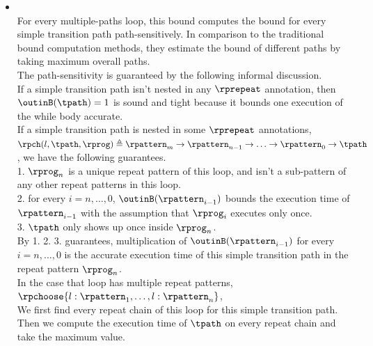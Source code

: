 \begin{itemize}
  \item
  \\
  For every multiple-paths loop,
  this bound computes the bound for every simple transition path path-sensitively.
  In comparison to the traditional bound computation methods, they
  estimate the bound of different paths by taking maximum overall paths.
  \\
  The path-sensitivity is guaranteed by the following informal discussion.
  \\
  If a simple transition path isn't nested in any $\rprepeat$ annotation, then
  $\outinB(\tpath) = 1$ is sound and tight because it bounds one execution of the while body accurate.
  \\
  If a simple transition path is nested in some $\rprepeat$ annotations,
  $\rpch(l, \tpath, \rprog) \triangleq \rpattern_m \to \rpattern_{n-1} \to \ldots \to \rpattern_{0} \to \tpath$, we have the following guarantees.
  \\
  1. $\rprog_n$ is a unique repeat pattern of this loop,
  and isn't a sub-pattern of any other repeat patterns in this loop.
  \\
  2. for every $i = n, \ldots, 0$, $\outinB(\rpattern_{i - 1})$ bounds the execution time of $\rpattern_{i - 1}$ with the assumption that $\rprog_{i}$ executes only once.
  \\
  3. $\tpath$ only shows up once inside $\rprog_n$.
  \\
  By 1. 2. 3. guarantees, multiplication of $\outinB(\rpattern_{i - 1})$ for every $i = n, \ldots, 0$ is the accurate execution time of this
  simple transition path in the repeat pattern $\rprog_n$.
  \\
  In the case that loop has multiple repeat patterns, $\rpchoose{l: \rpattern_1, \ldots, l: \rpattern_n}$,
  \\
  We first find every repeat chain of this loop for this simple transition path.
  Then we compute the execution time of $\tpath$ on every repeat chain and take the maximum value.
%  
  \end{itemize}

